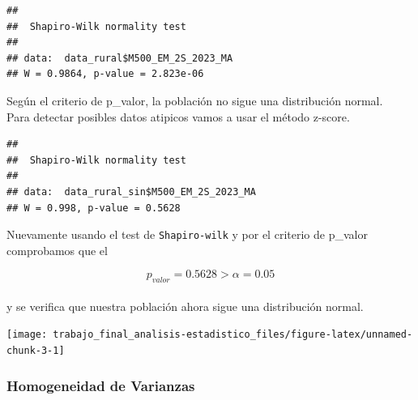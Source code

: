 \documentclass[
]{article}
\newenvironment{Shaded}{\begin{snugshade}}{\end{snugshade}}
\newcommand{\FunctionTok}[1]{\textcolor[rgb]{0.13,0.29,0.53}{\textbf{#1}}}
\newcommand{\NormalTok}[1]{#1}
\newcommand{\OtherTok}[1]{\textcolor[rgb]{0.56,0.35,0.01}{#1}}
\newcommand{\SpecialCharTok}[1]{\textcolor[rgb]{0.81,0.36,0.00}{\textbf{#1}}}
\newcommand{\StringTok}[1]{\textcolor[rgb]{0.31,0.60,0.02}{#1}}
\begin{document}
\begin{Shaded}
\end{Shaded}

\begin{verbatim}
## 
##  Shapiro-Wilk normality test
## 
## data:  data_rural$M500_EM_2S_2023_MA
## W = 0.9864, p-value = 2.823e-06
\end{verbatim}

Según el criterio de p\_valor, la población no sigue una distribución
normal.\\
Para detectar posibles datos atipicos vamos a usar el método z-score.

\begin{verbatim}
## 
##  Shapiro-Wilk normality test
## 
## data:  data_rural_sin$M500_EM_2S_2023_MA
## W = 0.998, p-value = 0.5628
\end{verbatim}

Nuevamente usando el test de \texttt{Shapiro-wilk} y por el criterio de
p\_valor comprobamos que el

\[p_{valor}=0.5628>\alpha=0.05\]\\
y se verifica que nuestra población ahora sigue una distribución normal.

\begin{center}\texttt{[image: trabajo\_final\_analisis-estadistico\_files/figure-latex/unnamed-chunk-3-1]} \end{center}

\subsubsection*{Homogeneidad de
Varianzas}\label{homogeneidad-de-varianzas}
\end{document}
